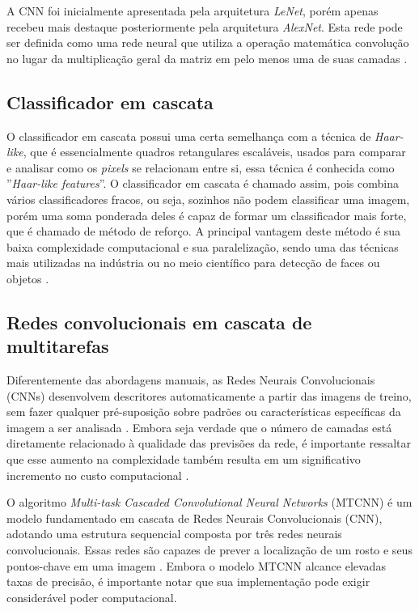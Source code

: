 A CNN foi inicialmente apresentada pela arquitetura \textit{LeNet},
porém apenas recebeu mais destaque posteriormente pela arquitetura \textit{AlexNet}. Esta rede
pode ser definida como uma rede neural que utiliza a operação matemática convolução
no lugar da multiplicação geral da matriz em pelo menos uma de suas camadas \cite[p. 6]{lecun1998}.

\subsection{Classificador em cascata}\label{subsec:cascatas}

O classificador em cascata possui uma certa semelhança com 
a técnica de \textit{Haar-like}, que é essencialmente quadros retangulares escaláveis, 
usados para comparar e analisar como os \textit{pixels} se relacionam entre si, essa 
técnica é conhecida como ''\textit{Haar-like features}''. O classificador em 
cascata é chamado assim, pois combina vários classificadores fracos, ou seja, 
sozinhos não podem classificar uma imagem, porém uma soma 
ponderada deles é capaz de formar um classificador mais forte, 
que é chamado de método de reforço. A principal vantagem deste método é sua baixa 
complexidade computacional e sua paralelização, sendo uma das técnicas mais 
utilizadas na indústria ou no meio científico para detecção de faces ou 
objetos \cite[p. 2]{viola2004}.

\subsection{Redes convolucionais em cascata de multitarefas}\label{subsec:multirarefas}

Diferentemente das abordagens manuais, as Redes Neurais Convolucionais 
(CNNs) desenvolvem descritores automaticamente a partir das imagens de 
treino, sem fazer qualquer pré-suposição sobre padrões ou características 
específicas da imagem a ser analisada \cite[p. 14]{zafeiriou2015}. 
Embora seja verdade que o número de camadas está diretamente relacionado 
à qualidade das previsões da rede, é importante ressaltar que esse aumento 
na complexidade também resulta em um significativo incremento no custo 
computacional \cite[p. 3]{mukherjee2015}.

O algoritmo \textit{Multi-task Cascaded Convolutional Neural Networks} (MTCNN) 
é um modelo fundamentado em cascata de Redes Neurais Convolucionais (CNN), 
adotando uma estrutura sequencial composta por três redes neurais 
convolucionais. Essas redes são capazes de prever a localização de um 
rosto e seus pontos-chave em uma imagem \cite[p. 1]{zhang2016}. Embora o 
modelo MTCNN alcance elevadas taxas de precisão, é importante notar que 
sua implementação pode exigir considerável poder computacional.

